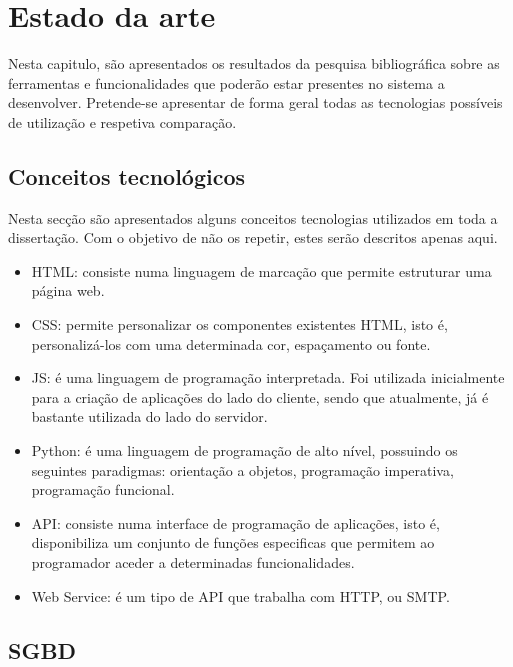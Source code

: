\chapter{Estado da arte}
\label{state}


Nesta capitulo, são apresentados os resultados da pesquisa bibliográfica sobre as ferramentas e funcionalidades que poderão estar presentes no sistema a desenvolver. Pretende-se apresentar de forma geral todas as tecnologias possíveis de utilização e respetiva comparação. 



\section{Conceitos tecnológicos}


Nesta secção são apresentados alguns conceitos tecnologias utilizados em toda a dissertação. Com o objetivo de não os repetir, estes serão descritos apenas aqui. 

\begin{itemize}
	\item \ac{HTML}: consiste numa linguagem de marcação que permite estruturar uma página web. 
	\item \ac{CSS}: permite personalizar os componentes existentes \ac{HTML}, isto é, personalizá-los com uma determinada cor, espaçamento ou fonte. 
	\item \ac{JS}: é uma linguagem de programação interpretada. Foi utilizada inicialmente para a criação de aplicações do lado do cliente, sendo que atualmente, já é bastante utilizada do lado do servidor. 
	
	\item Python: é uma  linguagem de programação de alto nível, possuindo os seguintes paradigmas:  orientação a objetos, programação imperativa, programação funcional. 
	
	
	\item \ac{API}: consiste numa interface de programação de aplicações, isto é, disponibiliza um conjunto de funções especificas que permitem ao programador aceder a determinadas funcionalidades.  
	
	\item Web Service: é um tipo de \ac{API} que trabalha com \ac{HTTP},
	ou \ac{SMTP}.
	
	
\end{itemize}



\section{\acl{SGBD}}

